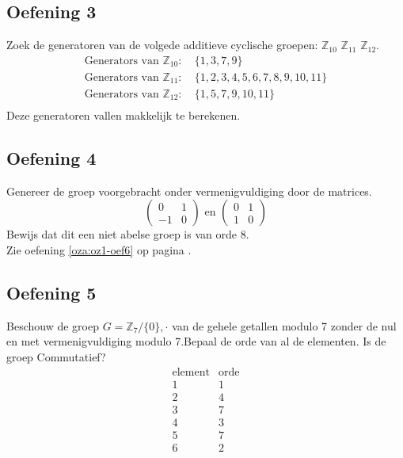 \documentclass[main.tex]{subfiles}
\begin{document}
\subsection*{Oefening 3}
Zoek de generatoren van de volgede additieve cyclische groepen: $\mathbb{Z}_{10}$ $\mathbb{Z}_{11}$ $\mathbb{Z}_{12}$.
\[
\begin{array}{rl}
  \text{Generators van } \mathbb{Z}_{10}:&\ \{ 1,3,7,9\}\\
  \text{Generators van } \mathbb{Z}_{11}:&\ \{ 1,2,3,4,5,6,7,8,9,10,11 \}\\
  \text{Generators van } \mathbb{Z}_{12}:&\ \{ 1,5,7,9,10,11 \}\\
\end{array}
\]
Deze generatoren vallen makkelijk te berekenen. 

\subsection*{Oefening 4}
Genereer de groep voorgebracht onder vermenigvuldiging door de matrices.
\[
\left( 
  \begin{array}{cc}
    0 & 1 \\
    -1 & 0
  \end{array} \right)
\text{ en }
\left(
  \begin{array}{cc}
    0 & 1 \\
    1 & 0
  \end{array}
\right)
\]
Bewijs dat dit een niet abelse groep is van orde 8.\\
Zie oefening \ref{oza:oz1-oef6} op pagina \pageref{oza:oz1-oef6}.

\subsection*{Oefening 5}
Beschouw de groep $G = \mathbb{Z}_{7} /\{0\},\cdot$ van de gehele getallen modulo 7 zonder de nul en met vermenigvuldiging modulo 7.Bepaal de orde van al de elementen. Is de groep Commutatief?
\[
\begin{array}{c|c}
  \text{element} & \text{orde}\\
  \hline
  1 & 1\\
  2 & 4\\
  3 & 7\\
  4 & 3\\
  5 & 7\\
  6 & 2\\
\end{array}
\]
\end{document}

